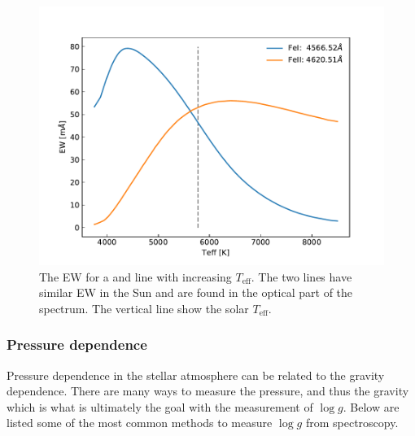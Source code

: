 \begin{figure}[htpb!]
    \centering
    \includegraphics[width=0.85\linewidth]{figures/ewTeff.pdf}
    \caption{The EW for a  and  line with increasing $T_\mathrm{eff}$. The
             two lines have similar EW in the Sun and are found in the optical part of the spectrum.
             The vertical line show the solar $T_\mathrm{eff}$.}
    \label{fig:ewTeff}
\end{figure}


\subsubsection{Pressure dependence}

Pressure dependence in the stellar atmosphere can be related to the gravity dependence. There are
many ways to measure the pressure, and thus the gravity which is what is ultimately the goal with
the measurement of $\log g$. Below are listed some of the most common methods to measure $\log g$
from spectroscopy.

